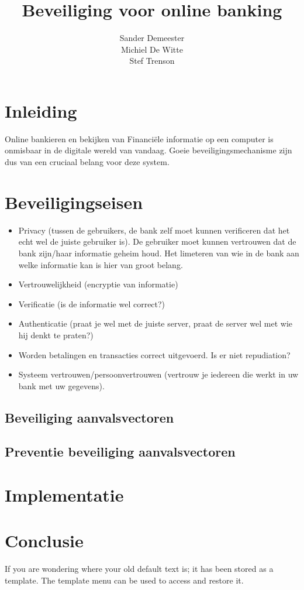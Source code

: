 \documentclass[11pt]{article}
\title{\textbf{Beveiliging voor online banking}}
\author{Sander Demeester\\
		Michiel De Witte\\
		Stef Trenson}
\date{}
\begin{document}
\maketitle

\section{Inleiding}
Online bankieren en bekijken van Financi\"ele informatie op een computer is onmisbaar in de digitale wereld van vandaag. Goeie beveiligingsmechanisme zijn dus van een cruciaal belang voor deze system. 

\section{Beveiligingseisen}
\begin{itemize}
\item Privacy (tussen de gebruikers, de bank zelf moet kunnen verificeren dat het echt wel de juiste gebruiker is). De gebruiker moet kunnen vertrouwen dat de bank zijn/haar informatie geheim houd. Het limeteren van wie in de bank aan welke informatie kan is hier van groot belang.
\item Vertrouwelijkheid (encryptie van informatie)
\item Verificatie (is de informatie wel correct?)
\item Authenticatie (praat je wel met de juiste server, praat de server wel met wie hij denkt te praten?)
\item Worden betalingen en transacties correct uitgevoerd. Is er niet repudiation?
\item Systeem vertrouwen/persoonvertrouwen (vertrouw je iedereen die werkt in uw bank met uw gegevens).
\end{itemize}
\subsection{Beveiliging aanvalsvectoren}

\subsection{Preventie beveiliging aanvalsvectoren}
\section{Implementatie}
\section{Conclusie}
If you are wondering where your old default text is; it has been stored as a template. The template menu can be used to access and restore it. 
\end{document}
